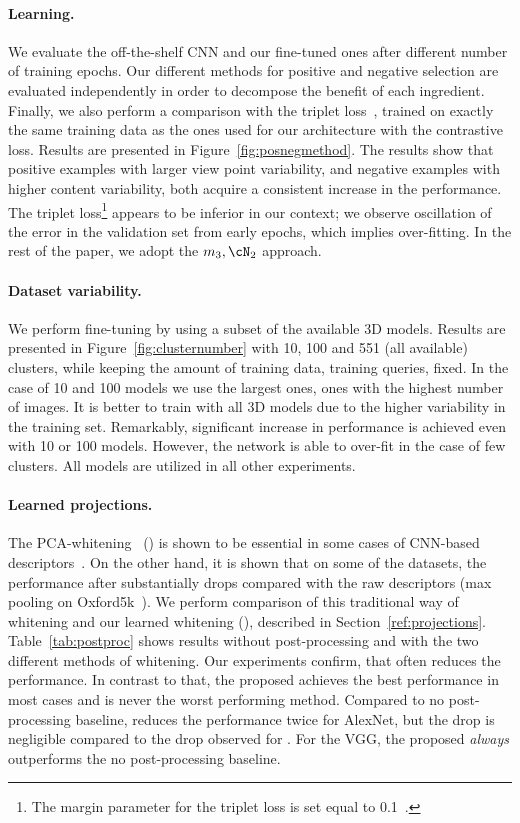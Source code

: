 \paragraph{Learning.}
%
We evaluate the off-the-shelf CNN and our fine-tuned ones after different number of training epochs. 
Our different methods for positive and negative selection are evaluated independently in order to decompose the benefit of each ingredient. 
Finally, we also perform a comparison with the triplet loss~\cite{AGTPS15}, trained on exactly the same training data as the ones used for our architecture with the contrastive loss. 
Results are presented in Figure~\ref{fig:posnegmethod}.
%
The results show that positive examples with larger view point variability, and negative examples with higher content variability, both acquire a consistent increase in the performance. 
The triplet loss\footnote{The margin parameter for the triplet loss is set equal to 0.1~\cite{AGTPS15}.} appears to be inferior in our context; we observe oscillation of the error in the validation set from early epochs, which implies over-fitting. 
In the rest of the paper, we adopt the $m_3,\cN_2$ approach.

\paragraph{Dataset variability.}
%
We perform fine-tuning by using a subset of the available 3D models. 
Results are presented in Figure~\ref{fig:clusternumber} with 10, 100 and 551 (all available) clusters, while keeping the amount of training data, \ie training queries, fixed.
In the case of 10 and 100 models we use the largest ones, \ie ones with the highest number of images.
It is better to train with all 3D models due to the higher variability in the training set. 
Remarkably, significant increase in performance is achieved even with 10 or 100 models. 
However, the network is able to over-fit in the case of few clusters.
All models are utilized in all other experiments.

\paragraph{Learned projections.}
%
The PCA-whitening~\cite{JC12} (\pcawhiten) is shown to be essential in some cases of CNN-based descriptors~\cite{BSCL14,BL15,TSJ16}.
On the other hand, it is shown that on some of the datasets, the performance after \pcawhiten substantially drops compared with the raw descriptors (max pooling on Oxford5k~\cite{BL15}). 
We perform comparison of this traditional way of whitening  and our learned whitening (), described in Section~\ref{ref:projections}.
Table~\ref{tab:postproc} shows results without post-processing and with the two different methods of whitening.
%
Our experiments confirm, that \pcawhiten often reduces the performance. In contrast to that, the proposed
 achieves the best performance in most cases and is never the worst performing method. Compared to no post-processing baseline,  reduces the performance twice for AlexNet, but the drop is negligible compared to the drop observed for \pcawhiten. For the VGG, the proposed  {\em always} outperforms the no post-processing baseline.

